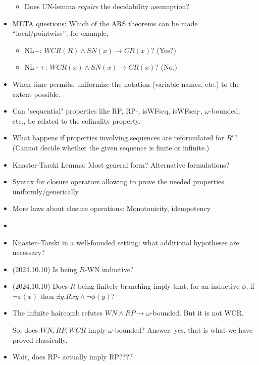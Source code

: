 \documentclass{scrartcl}
\begin{document}
\begin{itemize}
\begin{itemize}
        \item Does UN-lemma \emph{require} the decidability assumption?
      \end{itemize}
    \item META questions: Which of the ARS theorems can be made ``local/pointwise'',
    for example,
    \begin{itemize}
      \item NL+: $WCR(R) \land SN(x) \to CR(x)$?  (Yes?)
      \item NL++: $WCR(x) \land SN(x) \to CR(x)$? (No.)
    \end{itemize}
    \item When time permits, uniformize the notation (variable names, etc.) to the extent possible.
    \item Can "sequential" properties like RP, RP-, isWFseq, isWFseq-, $\omega$-bounded, etc.,
    be related to the cofinality property.
    \item What happens if properties involving sequences are reformulated for
  $R^r$? (Cannot decide whether the given sequence is finite or infinite.)
  \item Knaster-Tarski Lemma: Most general form? Alternative formulations?
  \item Syntax for closure operators allowing to prove the needed properties
  uniformly/generically
  \item More laws about closure operations: Monotonicity, idempotency
  \item \item Knaster--Tarski in a well-founded setting: what additional
  hypotheses are necessary?
  \item (2024.10.10) Is being $R$-WN inductive?
    \item (2024.10.10) Does $R$ being finitely branching imply
     that, for an inductive $\phi$, if $\lnot \phi(x)$ then
     $\exists y. Rxy \land \lnot \phi(y)$?

     \item The infinite haircomb refutes $WN \land RP \to \omega$-bounded.  But it is not WCR.

     So, does $WN, RP, WCR$ imply $\omega$-bounded?
     Answer: yes, that is what we have proved classically.
   
     \item Wait, does RP- actually imply RP????
   

\end{itemize}
\end{document}
